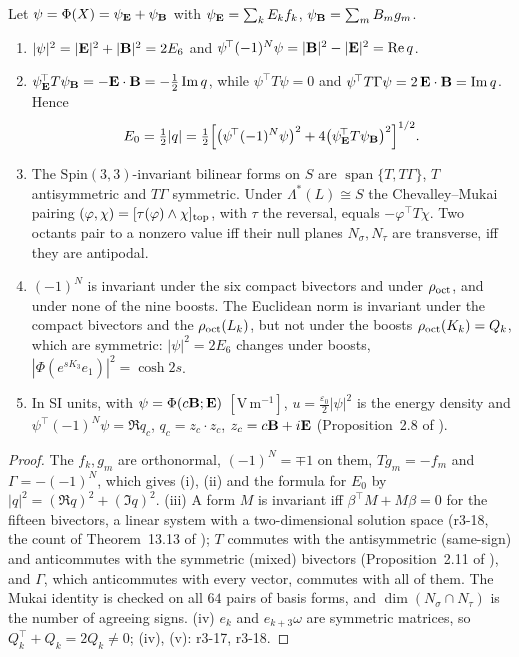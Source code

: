 \begin{proposition}
\label{r3:prop:energies}
Let $\psi=\Phi(X)=\psi_{\mathbf E}+\psi_{\mathbf B}$ with $\psi_{\mathbf E}=\sum_kE_kf_k$, $\psi_{\mathbf B}=\sum_mB_mg_m$.
\begin{enumerate}[label=(\roman*),leftmargin=2.2em]
\item $|\psi|^2=|\mathbf E|^2+|\mathbf B|^2=2E_6$ and $\psi^{\!\top}(-1)^N\psi=|\mathbf B|^2-|\mathbf E|^2=\operatorname{Re} q$.
\item $\psi_{\mathbf E}^{\!\top}T\psi_{\mathbf B}=-\mathbf E\cdot\mathbf B=-\tfrac12\operatorname{Im} q$, while $\psi^{\!\top}T\psi=0$ and $\psi^{\!\top}T\Gamma\psi=2\,\mathbf E\cdot\mathbf B=\operatorname{Im} q$. Hence
\[
E_0=\tfrac12|q|=\tfrac12\Bigl[\bigl(\psi^{\!\top}(-1)^N\psi\bigr)^2+4\bigl(\psi_{\mathbf E}^{\!\top}T\psi_{\mathbf B}\bigr)^2\Bigr]^{1/2}.
\]
\item The $\mathrm{Spin}(3,3)$-invariant bilinear forms on $S$ are $\operatorname{span}\{T,T\Gamma\}$, $T$ antisymmetric and $T\Gamma$ symmetric. Under
$\Lambda^*(L)\cong S$ the Chevalley--Mukai pairing $(\varphi,\chi)=[\tau(\varphi)\wedge\chi]_{\rm top}$, with $\tau$ the reversal, equals
$-\varphi^{\!\top}T\chi$. Two octants pair to a nonzero value iff their null planes $N_\sigma,N_\tau$ are transverse, iff they are antipodal.
\item $(-1)^N$ is invariant under the six compact bivectors and under $\rho_{\rm oct}$, and under none of the nine boosts. The Euclidean norm is
invariant under the compact bivectors and the $\rho_{\rm oct}(L_k)$, but not under the boosts $\rho_{\rm oct}(K_k)=Q_k$, which are symmetric:
$|\psi|^2=2E_6$ changes under boosts, $|\Phi(e^{sK_3}e_1)|^2=\cosh2s$.
\item In SI units, with $\psi=\Phi(c\mathbf B;\mathbf E)$ $[\mathrm{V\,m^{-1}}]$, $u=\tfrac{\varepsilon_0}2|\psi|^2$ is the energy density and
$\psi^{\!\top}(-1)^N\psi=\Re q_c$, $q_c=z_c\cdot z_c$, $z_c=c\mathbf B+i\mathbf E$ (Proposition~2.8 of \cite{RE}).
\end{enumerate}
\end{proposition}

\begin{proof}
The $f_k,g_m$ are orthonormal, $(-1)^N=\mp1$ on them, $Tg_m=-f_m$ and $\Gamma=-(-1)^N$, which gives (i), (ii) and the formula for $E_0$ by
$|q|^2=(\Re q)^2+(\Im q)^2$. (iii) A form $M$ is invariant iff $\beta^{\!\top}M+M\beta=0$ for the fifteen bivectors, a linear system with a
two-dimensional solution space (r3-18, the count of Theorem~13.13 of \cite{ES17}); $T$ commutes with the antisymmetric (same-sign) and
anticommutes with the symmetric (mixed) bivectors (Proposition~2.11 of \cite{RE}), and $\Gamma$, which anticommutes with every vector, commutes
with all of them. The Mukai identity is checked on all $64$ pairs of basis forms, and $\dim(N_\sigma\cap N_\tau)$ is the number of agreeing signs.
(iv) $e_k$ and $e_{k+3}\omega$ are symmetric matrices, so $Q_k^{\!\top}+Q_k=2Q_k\neq0$; (iv), (v): r3-17, r3-18.
\end{proof}

